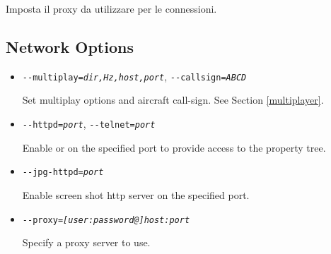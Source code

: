 \begin{itemize}
{\begin{itemize}
  Imposta il proxy da utilizzare per le connessioni.

  \end{itemize}
}
{
  \subsection{Network Options}
  \begin{itemize}
  \item{\texttt{-$ $-multiplay={\it dir,Hz,host,port}}, \texttt{-$ $-callsign={\it ABCD}}}

  Set multiplay options and aircraft call-sign. See Section \ref{multiplayer}.

  \item{\texttt{-$ $-httpd={\it port}}, \texttt{-$ $-telnet={\it port}}}

  Enable  or  on the specified port to provide
  access to the property tree.

  \item{\texttt{-$ $-jpg-httpd={\it port}}}

  Enable screen shot http server on the specified port.

  \item{\texttt{-$ $-proxy={\it [user:password@]host:port}}}

  Specify a proxy server to use.

  \end{itemize}
}

\end{itemize}
